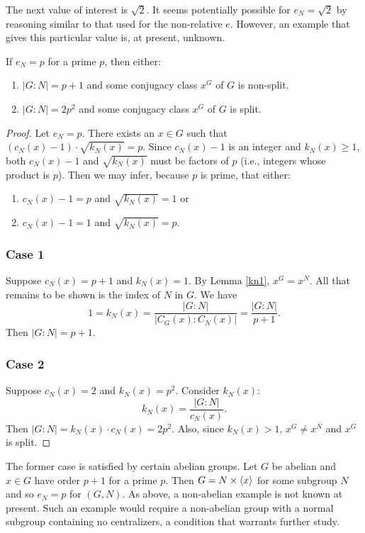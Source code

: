 \documentclass[main.tex]{subfiles}
\begin{document}
The next value of interest is $\sqrt{2}$. It seems potentially possible for $e_N = \sqrt{2}$ by reasoning similar to that used for the non-relative $e$. However, an example that gives this particular value is, at present, unknown.

\begin{theorem}
If $e_N = p$ for a prime $p$, then either:
\begin{enumerate}
	\item $|G:N| = p + 1$ and some conjugacy class $x^G$ of $G$ is non-split.
	\item $|G:N| = 2p^2$ and some conjugacy class $x^G$ of $G$ is split.
\end{enumerate}
\end{theorem}

\begin{proof}
Let $e_N = p$. There exists an $x \in G$ such that $(c_N(x) - 1) \cdot \sqrt{k_N(x)} = p$. Since $c_N(x) - 1$ is an integer and $k_N(x) \ge 1$, both $c_N(x) - 1$ and $\sqrt{k_N(x)}$ must be factors of $p$ (i.e., integers whose product is $p$). Then we may infer, because $p$ is prime, that either:
\begin{enumerate}
	\item $c_N(x) - 1 = p$ and $\sqrt{k_N(x)} = 1$ or
	\item $c_N(x) - 1 = 1$ and $\sqrt{k_N(x)} = p$.
\end{enumerate}

\subsubsection*{Case 1} Suppose $c_N(x) = p + 1$ and $k_N(x) = 1$. By Lemma \ref{kn1}, $x^G = x^N$. All that remains to be shown is the index of $N$ in $G$. We have
$$1 = k_N(x) = \frac{|G : N|}{|C_G(x):C_N(x)|} = \frac{|G : N|}{p + 1}\text{.}$$
Then $|G:N| = p+1$.

\subsubsection*{Case 2} Suppose $c_N(x) = 2$ and $k_N(x) = p^2$. Consider $k_N(x)$:
$$k_N(x) = \frac{|G:N|}{c_N(x)}\text{.}$$
Then $|G:N| = k_N(x) \cdot c_N(x) = 2p^2$. Also, since $k_N(x) > 1$, $x^G \ne x^N$ and $x^G$ is split.
\end{proof}

The former case is satisfied by certain abelian groups. Let $G$ be abelian and $x \in G$ have order $p + 1$ for a prime $p$. Then $G = N \times \langle x \rangle$ for some subgroup $N$ and so $e_N = p$ for $(G, N)$. As above, a non-abelian example is not known at present. Such an example would require a non-abelian group with a normal subgroup containing no centralizers, a condition that warrants further study.
\end{document}
